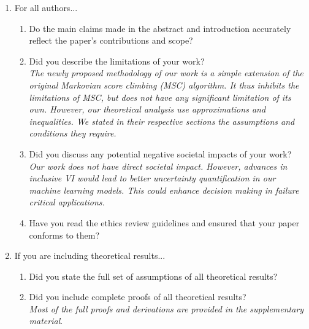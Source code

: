 \begin{enumerate}

\item For all authors...
\begin{enumerate}
  \item Do the main claims made in the abstract and introduction accurately reflect the paper's contributions and scope?
    \answerYes{}
  \item Did you describe the limitations of your work?
    \answerYes{} \\
    \textit{The newly proposed methodology of our work is a simple extension of the original Markovian score climbing (MSC) algorithm.
      It thus inhibits the limitations of MSC, but does not have any significant limitation of its own.
      However, our theoretical analysis use approximations and inequalities.
      We stated in their respective sections the assumptions and conditions they require.
    }
  \item Did you discuss any potential negative societal impacts of your work?
    \answerNo{} \\
    \textit{Our work does not have direct societal impact.
      However, advances in inclusive VI would lead to better uncertainty quantification in our machine learning models.
      This could enhance decision making in failure critical applications.
    }
  \item Have you read the ethics review guidelines and ensured that your paper conforms to them?
    \answerYes{}
\end{enumerate}

\item If you are including theoretical results...
\begin{enumerate}
  \item Did you state the full set of assumptions of all theoretical results?
    \answerYes{}
  \item Did you include complete proofs of all theoretical results?
    \answerYes{} \\
    \textit{Most of the full proofs and derivations are provided in the supplementary material}.
\end{enumerate}


\end{enumerate}
